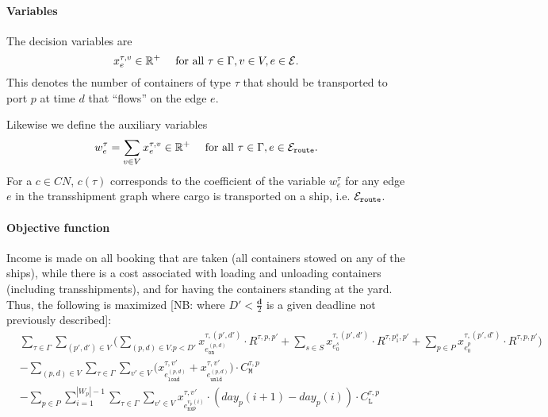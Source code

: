 \paragraph{Variables}
The decision variables are 
\[
x^{\tau,v}_e \in \mathbb{R}^+\quad \text{ for all } \tau\in \Gamma, v\in V, e\in \mathcal{E}.
\]
This denotes the number of containers of type $\tau$ that should be transported to port $p$ at time $d$ that ``flows'' on the edge $e$.

Likewise we define the auxiliary variables 
\[
w^{\tau}_e = \sum_{v\in V}x^{\tau,v}_e \in \mathbb{R}^+ \quad \text{ for all } \tau\in \Gamma, e\in \mathcal{E}_{\texttt{route}}. 
\]
For a $c\in CN$, $c(\tau)$ corresponds to the coefficient of the variable $w^\tau_e$ for any edge $e$ in the transshipment graph where cargo is transported on a ship, i.e. $\mathcal{E}_{\texttt{route}}$.
%
\paragraph{Objective function}
Income is made on all booking that are taken (all containers stowed on any of the ships), while there is a cost associated with loading and unloading containers (including transshipments), and for having the containers standing at the yard. Thus, the following is maximized [NB: where $D'<\frac{\mathbf{d}}{2}$ is a given deadline not previously described]:
\begin{align*}
&\sum_{\tau\in\Gamma}\sum_{(p',d') \in V}\Big(\sum_{(p,d) \in V. p<D'}x^{\tau,(p',d')}_{e^{(p,d)}_{\texttt{on}}}\cdot R^{\tau,p,p'}
+ \sum_{s \in S} x^{\tau,(p',d')}_{e^{s}_{0}}\cdot R^{\tau,p^s_1,p'} 
+ \sum_{p \in P}x^{\tau,(p',d')}_{e^{p}_{0}}\cdot R^{\tau,p,p'}\Big)\\
%
&-\sum_{(p,d) \in V}\sum_{\tau\in\Gamma}\sum_{v' \in V}\big(x^{\tau,v'}_{e^{(p,d)}_{\texttt{load}}} + x^{\tau,v'}_{e^{(p,d)}_{\texttt{unld}}}\big)\cdot C^{\tau,p}_{\texttt{M}}\\
&-\sum_{p \in P}\sum_{i =1}^{|W_p|-1}\sum_{\tau\in\Gamma}\sum_{v' \in V}x^{\tau,v'}_{e^{v_p(i)}_{\texttt{nxP}}}\cdot(\mathit{day}_p(i+1)-\mathit{day}_p(i))\cdot C^{\tau,p}_{\texttt{L}}\\
\end{align*}

